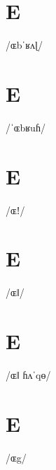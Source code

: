 \documentclass[10pt,a4paper,twoside]{book}
\begin{document}
\section*{E}

\begin{multicols}{3}
 {/ɶbˈʁʌɭ/} {}
\end{multicols}

\section*{E}

\begin{multicols}{3}
 {/ˈɶbʁuɦ/} {}
\end{multicols}

\section*{E}

\begin{multicols}{3}
 {/ɶǃ/} {}
\end{multicols}

\section*{E}

\begin{multicols}{3}
 {/ɶǁ/} {}
\end{multicols}

\section*{E}

\begin{multicols}{3}
 {/ɶǁ ɦʌˈqɵ/} {}
\end{multicols}

\section*{E}

\begin{multicols}{3}
 {/ɶg/} {}
\end{multicols}
\end{document}
